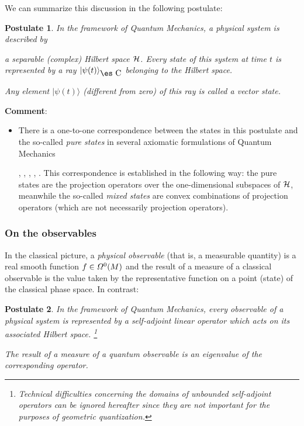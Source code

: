 \documentclass[12pt]{article}
\theoremstyle{plain}
\newtheorem{post}{Postulate}
\def\H{{\cal H}}
\def\Complex{\mbox{\es C}}
\begin{document}
We can summarize this discussion in the following postulate:

\begin{post}
In the framework of Quantum Mechanics, a physical system is described by

a
{\it separable (complex) Hilbert space} $\H$.
Every state of this system at time $t$ is represented by a
{\it ray} $|\psi (t) \rangle_{\Complex}$ belonging to the Hilbert space.

Any element $|\psi (t) \rangle $ (different from zero) of this ray is
called a {\rm vector state}.
\label{pos1}
\end{post}
{\bf Comment}:
\begin{itemize}
\item
There is a one-to-one correspondence between
the states in this postulate and the so-called
{\it pure states} in several axiomatic formulations of Quantum Mechanics

\cite{Mk-mfqm}, \cite{Mo-qmdo}, \cite{Se-pgqm}, \cite{Vn-mfqm},
\cite{Wl-tgqm}.
This correspondence is established in the following way:
the pure states are the projection operators over the one-dimensional
subspaces of $\H$,
meanwhile the so-called {\it mixed states} are convex combinations of
projection operators
(which are not necessarily  projection operators).
\end{itemize}


\subsubsection{On the observables}


In the classical picture, a {\it physical observable}
(that is, a measurable quantity) is a real smooth function
$f \in {\mit\Omega}^0(M)$ and the result of
a measure of a classical observable is the value taken by the
representative
function on a point (state) of the classical phase space.
In contrast:

\begin{post}
In the framework of Quantum Mechanics,
every observable of a physical system is represented by a
{\it self-adjoint linear operator} which acts on its associated Hilbert
space.%
\footnote{
Technical difficulties concerning the domains of unbounded self-adjoint
operators
can be ignored hereafter since they are not important
for the purposes of geometric quantization.
}

The result of a measure of a quantum observable
is an eigenvalue of the corresponding operator.
\label{pos2}
\end{post}
\end{document}
